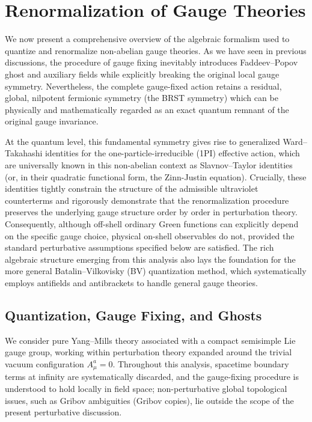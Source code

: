 \section{Renormalization of Gauge Theories}


We now present a comprehensive overview of the algebraic formalism used to quantize and renormalize non-abelian gauge theories. As we have seen in previous discussions, the procedure of gauge fixing inevitably introduces Faddeev--Popov ghost and auxiliary fields while explicitly breaking the original local gauge symmetry. Nevertheless, the complete gauge-fixed action retains a residual, global, nilpotent fermionic symmetry (the BRST symmetry) which can be physically and mathematically regarded as an exact quantum remnant of the original gauge invariance.

At the quantum level, this fundamental symmetry gives rise to generalized Ward--Takahashi identities for the one-particle-irreducible (1PI) effective action, which are universally known in this non-abelian context as Slavnov--Taylor identities (or, in their quadratic functional form, the Zinn-Justin equation). Crucially, these identities tightly constrain the structure of the admissible ultraviolet counterterms and rigorously demonstrate that the renormalization procedure preserves the underlying gauge structure order by order in perturbation theory. Consequently, although off-shell ordinary Green functions can explicitly depend on the specific gauge choice, physical on-shell observables do not, provided the standard perturbative assumptions specified below are satisfied. The rich algebraic structure emerging from this analysis also lays the foundation for the more general Batalin--Vilkovisky (BV) quantization method, which systematically employs antifields and antibrackets to handle general gauge theories.

\subsection{Quantization, Gauge Fixing, and Ghosts}

We consider pure Yang--Mills theory associated with a compact semisimple Lie gauge group, working within perturbation theory expanded around the trivial vacuum configuration \(A_\mu^a = 0\). Throughout this analysis, spacetime boundary terms at infinity are systematically discarded, and the gauge-fixing procedure is understood to hold locally in field space; non-perturbative global topological issues, such as Gribov ambiguities (Gribov copies), lie outside the scope of the present perturbative discussion.

